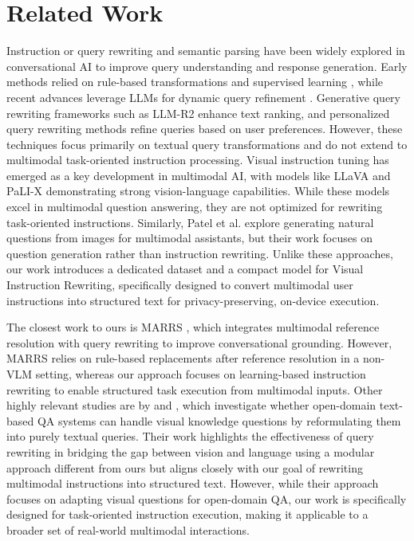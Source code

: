 \section{Related Work}
\label{sec:related_work}
Instruction or query rewriting and semantic parsing have been widely explored in conversational AI to improve query understanding and response generation. Early methods relied on rule-based transformations and supervised learning \cite{semantic_parsing_survey}, while recent advances leverage LLMs for dynamic query refinement \cite{ye2023large, mo2023convgqr}. Generative query rewriting frameworks such as LLM-R2 \cite{llm-r2} enhance text ranking, and personalized query rewriting methods \cite{cho-etal-2021-personalized} refine queries based on user preferences. However, these techniques focus primarily on textual query transformations and do not extend to multimodal task-oriented instruction processing. Visual instruction tuning has emerged as a key development in multimodal AI, with models like LLaVA \cite{liu2023visual} and PaLI-X \cite{chen2023pali} demonstrating strong vision-language capabilities. While these models excel in multimodal question answering, they are not optimized for rewriting task-oriented instructions. Similarly, Patel et al. \cite{patel2020generating} explore generating natural questions from images for multimodal assistants, but their work focuses on question generation rather than instruction rewriting. Unlike these approaches, our work introduces a dedicated dataset and a compact model for Visual Instruction Rewriting, specifically designed to convert multimodal user instructions into structured text for privacy-preserving, on-device execution.  

The closest work to ours is MARRS \cite{ates2023marrs}, which integrates multimodal reference resolution with query rewriting to improve conversational grounding. However, MARRS relies on rule-based replacements after reference resolution in a non-VLM setting, whereas our approach focuses on learning-based instruction rewriting to enable structured task execution from multimodal inputs. Other highly relevant studies are by  and , which investigate whether open-domain text-based QA systems can handle visual knowledge questions by reformulating them into purely textual queries. Their work highlights the effectiveness of query rewriting in bridging the gap between vision and language using a modular approach different from ours but aligns closely with our goal of rewriting multimodal instructions into structured text. However, while their approach focuses on adapting visual questions for open-domain QA, our work is specifically designed for task-oriented instruction execution, making it applicable to a broader set of real-world multimodal interactions.